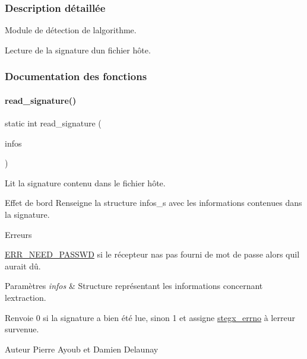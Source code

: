 \subsubsection{Description détaillée}
Module de détection de l\textquotesingle{}algorithme. 

Lecture de la signature d\textquotesingle{}un fichier hôte. 

\subsubsection{Documentation des fonctions}
\mbox{\label{a00050_a4ff8628a8b7e85f4a4b8dda0d66c23b5}} 
\paragraph{\texorpdfstring{read\+\_\+signature()}{read\_signature()}}
{\footnotesize\ttfamily static int read\+\_\+signature (\begin{DoxyParamCaption}\item[{\hyperlink{a00008_aa8ca908d92fb5bdd3c0a9e1f58b2cf03}{info\+\_\+s} $\ast$}]{infos }\end{DoxyParamCaption})\hspace{0.3cm}{\ttfamily [static]}}



Lit la signature contenu dans le fichier hôte. 

\begin{DoxyParagraph}{Effet de bord}
Renseigne la structure infos\+\_\+s avec les informations contenues dans la signature. 
\end{DoxyParagraph}
\begin{DoxyRefDesc}{Erreurs}
\item[\hyperlink{a00134__errors000009}{Erreurs}]\hyperlink{a00011_a08b18ac8af0f3462354240d9732f3852a0639f3719d0bf22c36b5ca1711fe3d7e}{E\+R\+R\+\_\+\+N\+E\+E\+D\+\_\+\+P\+A\+S\+S\+WD} si le récepteur n\textquotesingle{}as pas fourni de mot de passe alors qu\textquotesingle{}il aurait dû. \end{DoxyRefDesc}

\begin{DoxyParams}{Paramètres}
{\em infos} & Structure représentant les informations concernant l\textquotesingle{}extraction. \\
\hline
\end{DoxyParams}
\begin{DoxyReturn}{Renvoie}
0 si la signature a bien été lue, sinon 1 et assigne \hyperlink{a00062_a5ec48ccdfbe19fe23855818f8556abec}{stegx\+\_\+errno} à l\textquotesingle{}erreur survenue. 
\end{DoxyReturn}
\begin{DoxyAuthor}{Auteur}
Pierre Ayoub et Damien Delaunay 
\end{DoxyAuthor}


